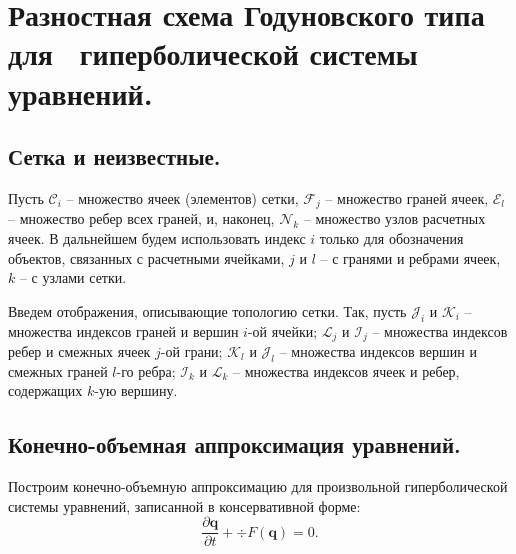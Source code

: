 \documentclass[14pt, a4paper, fleqn]{extreport}
\begin{document}
    \section{Разностная схема Годуновского типа для \
             гиперболической системы уравнений.}

    \subsection{Сетка и неизвестные.}
    
    Пусть 
    $\mathcal{C}_i$ -- множество ячеек (элементов) сетки,
    $\mathcal{F}_j$ -- множество граней ячеек,
    $\mathcal{E}_l$ -- множество ребер всех граней, и, наконец,
    $\mathcal{N}_k$ -- множество узлов расчетных ячеек.
    В дальнейшем будем использовать индекс $i$ только для обозначения объектов, 
    связанных с расчетными ячейками, $j$ и $l$ -- с гранями и ребрами ячеек, $k$ -- с узлами сетки.
    
    Введем отображения, описывающие топологию сетки.
    Так, пусть 
    $\mathcal{J}_i$ и $\mathcal{K}_i$ -- множества индексов граней и вершин $i$-ой ячейки;
    $\mathcal{L}_j$ и $\mathcal{I}_j$ -- множества индексов ребер и смежных ячеек $j$-ой грани;
    $\mathcal{K}_l$ и $\mathcal{J}_l$ -- множества индексов вершин и смежных граней $l$-го ребра;
    $\mathcal{I}_k$ и $\mathcal{L}_k$ -- множества индексов ячеек и ребер, содержащих $k$-ую вершину.
    
    \subsection{Конечно-объемная аппроксимация уравнений.}
    
    Построим конечно-объемную аппроксимацию для
    произвольной гиперболической системы уравнений, записанной в консервативной форме:
    \begin{equation}
        \label{hyperb_eqs}
        \dfrac{\partial \textbf{q}}{\partial t} + \div{F(\textbf{q})} = 0.
    \end{equation}
    
\end{document}

